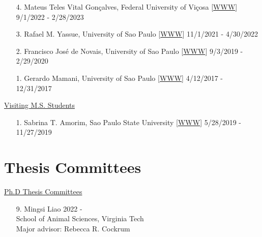 \documentclass[margin,line,10pt]{res}
\begin{document}
\begin{resume}
\begin{enumerate}
  \item [4.] Mateus Teles Vital Gon\c calves, Federal University of Vi\c cosa [\textcolor{blue}{\href{https://goncalvesmateu.github.io}{WWW}}]  \hfill  9/1/2022 - 2/28/2023

  \vspace{0.3cm}

\item [3.] Rafael M. Yassue,  University of Sao Paulo [\textcolor{blue}{\href{https://rafaelyassue.github.io/cv-online/}{WWW}}]  \hfill  11/1/2021 - 4/30/2022

    \vspace{0.3cm}

\item [2.] Francisco Jos\'{e} de Novais,  University of Sao Paulo [\textcolor{blue}{\href{https://fjnovais.github.io/}{WWW}}]  \hfill  9/3/2019 - 2/29/2020

\vspace{0.3cm}

\item [1.] Gerardo Mamani, University of Sao Paulo  [\textcolor{blue}{\href{https://github.com/gerardocorn}{WWW}}]  \hfill 4/12/2017 - 12/31/2017
\end{enumerate}



\begin{flushleft}
\hspace{0.2cm} \underline{Visiting M.S. Students}
\end{flushleft}
\begin{enumerate}
\item [1.] Sabrina T. Amorim, Sao Paulo State University [\textcolor{blue}{\href{https://sabrinaam.github.io/}{WWW}}]  \hfill 5/28/2019 - 11/27/2019
\end{enumerate}


\vspace{0.5cm}
\section{\sc Thesis Committees}

\begin{flushleft}
\hspace{0.2cm} \underline{Ph.D Thesis Committees}
\end{flushleft}
\begin{enumerate}





  \item [9.] Mingsi Liao \hfill 2022 - \\
  School of Animal Sciences,  Virginia Tech \\ 
  Major advisor: Rebecca R. Cockrum 


\end{enumerate}
\end{resume}
\end{document}

